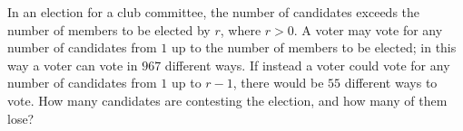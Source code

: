 In an election for a club committee, the number of candidates exceeds the number of members to be elected by $r$, where $r>0$. A voter may vote for any number of candidates from $1$ up to the number of members to be elected; in this way a voter can vote in $967$ different ways. If instead a voter could vote for any number of candidates from $1$ up to $r-1$, there would be $55$ different ways to vote. How many candidates are contesting the election, and how many of them lose?
